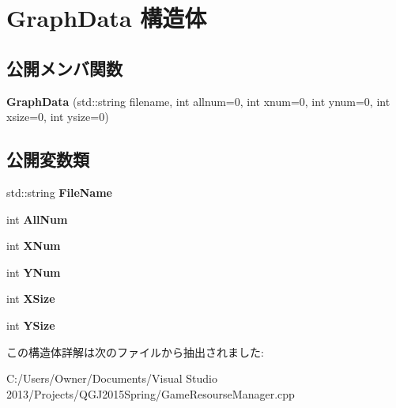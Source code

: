 \hypertarget{struct_graph_data}{}\section{Graph\+Data 構造体}
\label{struct_graph_data}
\subsection*{公開メンバ関数}
\begin{DoxyCompactItemize}
\item 
{\bfseries Graph\+Data} (std\+::string filename, int allnum=0, int xnum=0, int ynum=0, int xsize=0, int ysize=0)\hypertarget{struct_graph_data_a703f6f05f0589018084ad0244024cc9c}{}\label{struct_graph_data_a703f6f05f0589018084ad0244024cc9c}

\end{DoxyCompactItemize}
\subsection*{公開変数類}
\begin{DoxyCompactItemize}
\item 
std\+::string {\bfseries File\+Name}\hypertarget{struct_graph_data_a94de06b2cc9d356afb8d4b0292802251}{}\label{struct_graph_data_a94de06b2cc9d356afb8d4b0292802251}

\item 
int {\bfseries All\+Num}\hypertarget{struct_graph_data_a16a43d0a9e975a5de05c2dcab44ba1f9}{}\label{struct_graph_data_a16a43d0a9e975a5de05c2dcab44ba1f9}

\item 
int {\bfseries X\+Num}\hypertarget{struct_graph_data_a0005288fab56b738ddae9851f146d143}{}\label{struct_graph_data_a0005288fab56b738ddae9851f146d143}

\item 
int {\bfseries Y\+Num}\hypertarget{struct_graph_data_a5bcd47301abdac2f8d0bf325b9aeecd0}{}\label{struct_graph_data_a5bcd47301abdac2f8d0bf325b9aeecd0}

\item 
int {\bfseries X\+Size}\hypertarget{struct_graph_data_ad45d13429d31ba22686653b10beb8886}{}\label{struct_graph_data_ad45d13429d31ba22686653b10beb8886}

\item 
int {\bfseries Y\+Size}\hypertarget{struct_graph_data_a8ae99bd75b213f62ec51a151a120e3eb}{}\label{struct_graph_data_a8ae99bd75b213f62ec51a151a120e3eb}

\end{DoxyCompactItemize}


この構造体詳解は次のファイルから抽出されました\+:\begin{DoxyCompactItemize}
\item 
C\+:/\+Users/\+Owner/\+Documents/\+Visual Studio 2013/\+Projects/\+Q\+G\+J2015\+Spring/Game\+Resourse\+Manager.\+cpp\end{DoxyCompactItemize}
